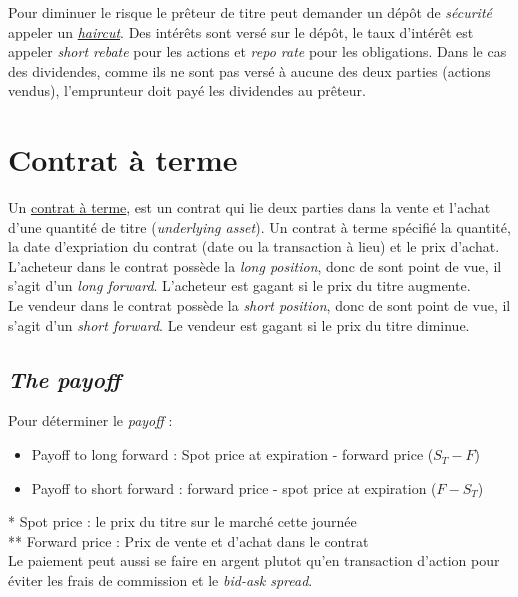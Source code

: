 \documentclass[11pt,french]{report}
\begin{document}
Pour diminuer le risque le prêteur de titre peut demander un dépôt de \emph{sécurité} appeler un \href{http://www.investopedia.com/terms/h/haircut.asp?o=40186&l=dir&qsrc=1&qo=serpSearchTopBox&ap=investopedia.com}{\emph{haircut}}. Des intérêts sont versé sur le dépôt, le taux d'intérêt est appeler \emph{short rebate} pour les actions et \emph{repo rate} pour les obligations. Dans le cas des dividendes, comme ils ne sont pas versé à aucune des deux parties (actions vendus), l'emprunteur doit payé les dividendes au prêteur. 




\chapter{Contrat à terme}
\label{cha:contrat à terme}

Un \href{http://www.investopedia.com/terms/f/forwardcontract.asp?o=40186&l=dir&qsrc=999&qo=investopediaSiteSearch}{contrat à terme}, est un contrat qui lie deux parties dans la vente et l'achat d'une quantité de titre (\emph{underlying asset}). Un contrat à terme spécifié la quantité, la date d'expriation du contrat (date ou la transaction à lieu) et le prix d'achat.
\\
L'acheteur dans le contrat possède la \emph{long position}, donc de sont point de vue, il s'agit d'un \emph{long forward}. L'acheteur est gagant si le prix du titre augmente.
\\ Le vendeur dans le contrat possède la \emph{short position}, donc de sont point de vue, il s'agit d'un \emph{short forward}. Le vendeur est gagant si le prix du titre diminue.

\section{\emph{The payoff}}

Pour déterminer le \emph{payoff} :
\begin{itemize}
\item Payoff to long forward : Spot price at expiration - forward price ($S_{T} - F$)
\item Payoff to short forward : forward price - spot price at expiration ($F - S_{T}$)
\end{itemize}
* Spot price : le prix du titre  sur le marché cette journée
\\
** Forward price : Prix de vente et d'achat dans le contrat
\\
Le paiement peut aussi se faire en argent plutot qu'en transaction d'action pour éviter les frais de commission et le \emph{bid-ask spread}.
\end{document}
